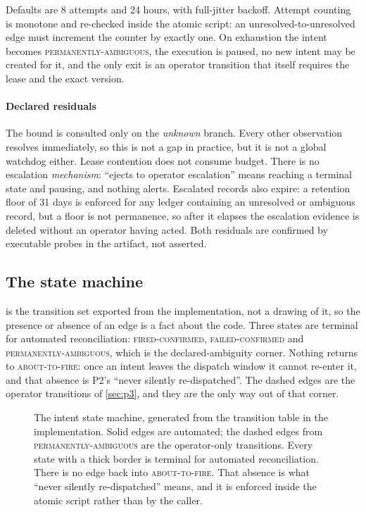 Defaults are 8 attempts and 24 hours, with full-jitter backoff. Attempt
counting is monotone and re-checked inside the atomic script: an
unresolved-to-unresolved edge must increment the counter by exactly one. On
exhaustion the intent becomes \textsc{permanently-ambiguous}, the execution is
paused, no new intent may be created for it, and the only exit is an operator
transition that itself requires the lease and the exact version.

\paragraph{Declared residuals} The bound is consulted only on the
\emph{unknown} branch. Every other observation resolves immediately, so this
is not a gap in practice, but it is not a global watchdog either. Lease
contention does not consume budget. There is no escalation \emph{mechanism}:
``ejects to operator escalation'' means reaching a terminal state and pausing,
and nothing alerts. Escalated records also expire: a retention floor of 31
days is enforced for any ledger containing an unresolved or ambiguous record,
but a floor is not permanence, so after it elapses the escalation evidence is
deleted without an operator having acted. Both residuals are confirmed by
executable probes in the artifact, not asserted.

\subsection{The state machine}

 is the transition set exported from the implementation,
not a drawing of it, so the presence or absence of an edge is a fact about the
code. Three states are terminal for automated reconciliation:
\textsc{fired-confirmed}, \textsc{failed-confirmed} and
\textsc{permanently-ambiguous}, which is the declared-ambiguity corner. Nothing
returns to \textsc{about-to-fire}: once an intent leaves the dispatch window it
cannot re-enter it, and that absence is P2's ``never silently re-dispatched''.
The dashed edges are the operator transitions of \cref{sec:p3}, and they are the
only way out of that corner.

\begin{figure}[t]
\centering

\caption{The intent state machine, generated from the transition table in
the implementation. Solid edges are automated; the dashed edges
from \textsc{permanently-ambiguous} are the operator-only transitions. Every
state with a thick border is terminal for automated reconciliation. There is no
edge
back into \textsc{about-to-fire}. That absence is what ``never silently
re-dispatched'' means, and it is enforced inside the atomic script rather than
by the caller.}
\label{fig:statemachine}
\end{figure}

